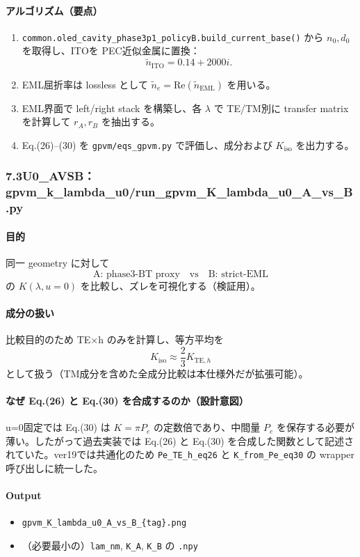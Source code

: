 \documentclass[a4paper,11pt]{jsarticle} %
\begin{document}
\paragraph{アルゴリズム（要点）}
\begin{enumerate}
\item \texttt{common.oled\_cavity\_phase3p1\_policyB.build\_current\_base()} から $n_0,d_0$ を取得し、ITOを PEC近似金属に置換：
\[
\tilde n_{\mathrm{ITO}}=0.14+2000i.
\]
\item EML屈折率は lossless として $\tilde n_e=\mathrm{Re}(\tilde n_{\mathrm{EML}})$ を用いる。
\item EML界面で left/right stack を構築し、各 $\lambda$ で TE/TM別に transfer matrix を計算して $r_A,r_B$ を抽出する。
\item Eq.(26)--(30) を \texttt{gpvm/eqs\_gpvm.py} で評価し、成分および $K_{\mathrm{iso}}$ を出力する。
\end{enumerate}

\subsubsection*{7.3\;U0\_AVSB：gpvm\_k\_lambda\_u0/run\_gpvm\_K\_lambda\_u0\_A\_vs\_B.py}
\paragraph{目的}
同一 geometry に対して
\[
\text{A: phase3-BT proxy}\quad \text{vs}\quad \text{B: strict-EML}
\]
の $K(\lambda,u=0)$ を比較し、ズレを可視化する（検証用）。

\paragraph{成分の扱い}
比較目的のため TE×h のみを計算し、等方平均を
\[
K_{\mathrm{iso}}\approx \frac{2}{3}K_{\mathrm{TE},h}
\]
として扱う（TM成分を含めた全成分比較は本仕様外だが拡張可能）。

\paragraph{なぜ Eq.(26) と Eq.(30) を合成するのか（設計意図）}
u=0固定では Eq.(30) は $K=\pi P_e$ の定数倍であり、中間量 $P_e$ を保存する必要が薄い。したがって過去実装では Eq.(26) と Eq.(30) を合成した関数として記述されていた。ver19では共通化のため \texttt{Pe\_TE\_h\_eq26} と \texttt{K\_from\_Pe\_eq30} の wrapper 呼び出しに統一した。

\paragraph{Output}
\begin{itemize}
\item \texttt{gpvm\_K\_lambda\_u0\_A\_vs\_B\_\{tag\}.png}
\item （必要最小の）\texttt{lam\_nm}, \texttt{K\_A}, \texttt{K\_B} の \texttt{.npy}
\end{itemize}
\end{document}
